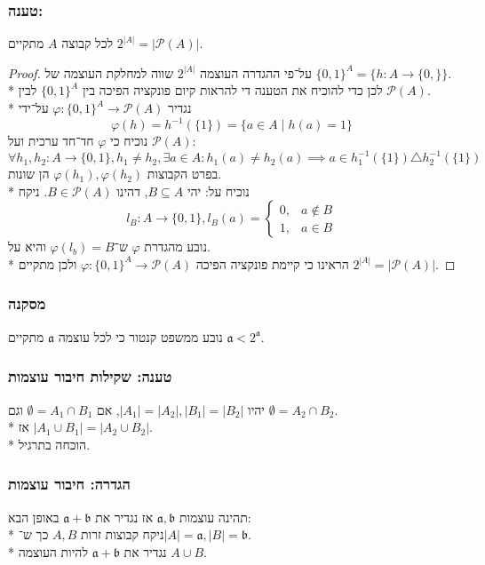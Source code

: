 \subsubsection{טענה: }
לכל קבוצה $A$ מתקיים $2^{|A|} = |\mathcal{P}(A)|$.
\begin{proof}
	על־פי ההגדרה העוצמה $2^|A|$ שווה למחלקת העוצמה של ${\{0, 1\}}^A = \{ h : A \to \{0, \}\}$. \\*
	לכן כדי להוכיח את הטענה די להראות קיום פונקציה הפיכה בין ${\{0, 1\}}^A$ לבין $\mathcal{P}(A)$. \\*
	נגדיר $\varphi : {\{0, 1\}}^A \to \mathcal{P}(A)$ על־ידי
	\[
		\varphi(h) = h^{-1}(\{1\}) = \{ a \in A \mid h(a) = 1\}
	\]
	נוכיח כי $\varphi$ חד־חד ערכית ועל $\mathcal{P}(A)$:
	\[
		\forall h_1, h_2 : A \to \{0, 1\}, h_1 \ne h_2,
		\exists a \in A : h_1(a) \ne h_2(a)
		\implies
		a \in h_1^{-1}(\{1\}) \triangle h_2^{-1}(\{1\})
	\]
	בפרט הקבוצות $\varphi(h_1), \varphi(h_2)$ הן שונות. \\*
	נוכיח על: יהי $B \subseteq A$, דהינו $B \in \mathcal{P}(A)$. ניקח
	\[
		l_B : A \to \{0, 1\}, l_B(a) = \begin{cases}
			0, & a \notin B \\
			1, & a \in B
		\end{cases}
	\]
	נובע מהגדרת $\varphi$ ש־$\varphi(l_b) = B$ והיא על. \\*
	הראינו כי קיימת פונקציה הפיכה $\varphi : {\{0, 1\}}^A \to \mathcal{P}(A)$ ולכן מתקיים $2^{|A|} = |\mathcal{P}(A)|$.
\end{proof}

\subsubsection{מסקנה}
נובע ממשפט קנטור כי לכל עוצמה $\mathfrak{a}$ מתקיים $\mathfrak{a} < 2^\mathfrak{a}$.

\subsubsection{טענה: שקילות חיבור עוצמות}
יהיו $|A_1| = |A_2|, |B_1| = |B_2|$, אם $\emptyset = A_1 \cap B_1$ וגם $\emptyset = A_2 \cap B_2$. \\*
אז $|A_1 \cup B_1| = |A_2 \cup B_2|$. \\*
הוכחה בתרגיל.

\subsubsection{הגדרה: חיבור עוצמות}
תהינה עוצמות $\mathfrak{a}, \mathfrak{b}$ אז נגדיר את $\mathfrak{a} + \mathfrak{b}$ באופן הבא: \\*
ניקח קבוצות זרות $A, B$ כך ש־$|A| = \mathfrak{a}, |B| = \mathfrak{b}$. \\*
נגדיר את $\mathfrak{a} + \mathfrak{b}$ להיות העוצמה $A \cup B$.

